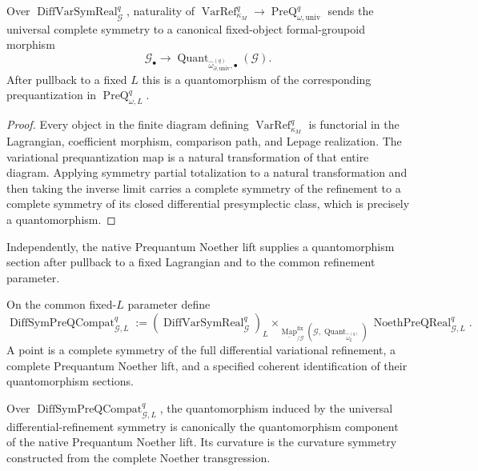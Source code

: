 \begin{proposition}
\label{prop:prequantum-differential-symmetry-to-quantomorphism}
Over $\operatorname{DiffVarSymReal}^{q}_{\mathcal G}$, naturality of
$\operatorname{VarRef}_{\kappa_M}^q\to
\operatorname{PreQ}_{\omega,\mathrm{univ}}^q$ sends the universal complete
symmetry to a canonical fixed-object formal-groupoid morphism
\[
\boxed{
\mathcal G_\bullet
\longrightarrow
\operatorname{Quant}_{\widehat\omega_{\partial,\mathrm{univ}}^{(q)},\bullet}
(\mathcal G).
}
\]
After pullback to a fixed $L$ this is a quantomorphism of the corresponding
prequantization in $\operatorname{PreQ}_{\omega,L}^q$.
\end{proposition}

\begin{proof}
Every object in the finite diagram defining
$\operatorname{VarRef}_{\kappa_M}^q$ is functorial in the Lagrangian, coefficient
morphism, comparison path, and Lepage realization.  The variational
prequantization map is a natural transformation of that entire diagram.
Applying symmetry partial totalization to a natural transformation and then
taking the inverse limit carries a complete symmetry of the refinement to a
complete symmetry of its closed differential presymplectic class, which is
precisely a quantomorphism.
\end{proof}

Independently, the native Prequantum Noether lift supplies a quantomorphism
section after pullback to a fixed Lagrangian and to the common refinement
parameter.

\begin{definition}
\label{def:prequantum-differential-symmetry-compatibility-realization}
On the common fixed-$L$ parameter define
\[
\boxed{
\operatorname{DiffSymPreQCompat}_{\mathcal G,L}^{q}
:=
(\operatorname{DiffVarSymReal}^{q}_{\mathcal G})_L
\times_{
\underline{\operatorname{Map}}^{\mathrm{fix}}_{/\mathcal G}
(\mathcal G,
 \operatorname{Quant}_{\widehat\omega_L^{(q)}})}
\operatorname{NoethPreQReal}_{\mathcal G,L}^{q}.
}
\]
A point is a complete symmetry of the full differential variational refinement,
a complete Prequantum Noether lift, and a specified coherent identification of
their quantomorphism sections.
\end{definition}

\begin{proposition}
\label{prop:prequantum-differential-symmetry-produces-native-lift}
Over $\operatorname{DiffSymPreQCompat}_{\mathcal G,L}^{q}$, the quantomorphism
induced by the universal differential-refinement symmetry is canonically the
quantomorphism component of the native Prequantum Noether lift.  Its curvature
is the curvature symmetry constructed from the complete Noether transgression.
\end{proposition}

